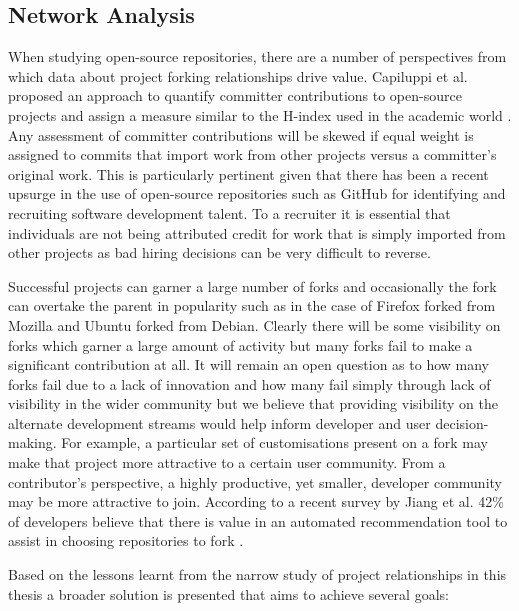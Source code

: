 \subsection{Network Analysis}
When studying open-source repositories, there are a number of perspectives from which data about project forking relationships drive value. Capiluppi et al. proposed  an approach to quantify committer contributions to open-source projects and assign a measure similar to the H-index used in the academic world \citep{capiluppi2012developing}. Any assessment of committer contributions will be skewed if equal weight is assigned to commits that import work from other projects versus a committer's original work.  This is particularly pertinent given that there has been a recent upsurge in the use of open-source repositories such as GitHub for identifying and recruiting software development talent. To a recruiter it is essential that individuals are not being attributed credit for work that is simply imported from other projects as bad hiring decisions can be very difficult to reverse.

Successful projects can garner a large number of forks and occasionally the fork can overtake the parent in popularity such as in the case of Firefox forked from Mozilla and Ubuntu forked from Debian. Clearly there will be some visibility on forks which garner a large amount of activity but many forks fail to make a significant contribution at all. It will remain an open question as to how many forks fail due to a lack of innovation and how many fail simply through lack of visibility in the wider community but we believe that providing visibility on the  alternate development streams would help inform developer and user decision-making. For example, a particular set of customisations present on a fork may make that project more attractive to a certain user community. From a contributor's perspective, a highly productive, yet smaller, developer community may be more attractive to join. According to a recent survey by Jiang et al. 42\% of developers believe that there is value in an automated recommendation tool to assist in choosing repositories to fork \citep{jiang2017and}. 

Based on the lessons learnt from the narrow study of project relationships in this thesis a broader solution is presented that aims to achieve several goals:

